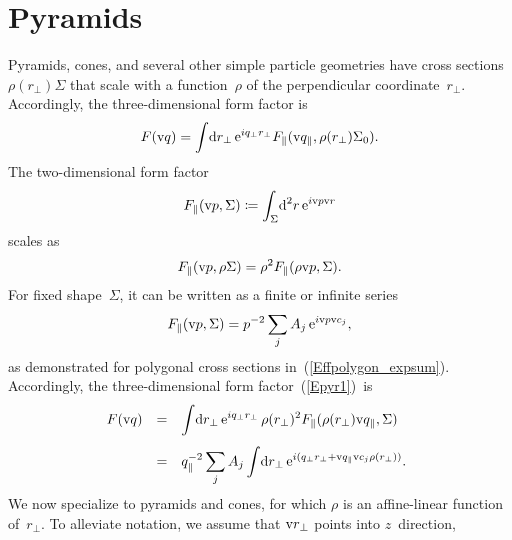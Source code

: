 %
%

\section{Pyramids}

%
%
%
%

Pyramids, cones, and several other simple particle geometries
 have cross sections~$\rho(r_\perp)\Sigma$ that scale
with a function~$\rho$ of the perpendicular coordinate~$r_\perp$.
Accordingly,
the three-dimensional form factor is
\begin{equation}\label{Epyr1}
  F(\text{v}{q})
  = \int\!\text{d} r_\perp\,\text{e}^{iq_\perp r_\perp} F_\parallel(\text{v}{q}_\parallel,\rho(r_\perp)\Sigma_0).
\end{equation}
The two-dimensional form factor
\begin{equation}
  F_\parallel(\text{v}{p},\Sigma) \coloneqq \int_\Sigma\!\text{d}^2r\,\text{e}^{i\text{v}{p}\text{v}{r}}
\end{equation}
scales as
\begin{equation}
  F_\parallel(\text{v}{p},\rho\Sigma) = \rho^2 F_\parallel(\rho\text{v}{p},\Sigma).
\end{equation}
For fixed shape~$\Sigma$,
it can be written as a finite or infinite series
\begin{equation}
  F_\parallel(\text{v}{p},\Sigma)=p^{-2}\sum_j A_j\, \text{e}^{i\text{v}{p} \text{v}{c}_j},
\end{equation}
as demonstrated for polygonal cross sections in~(\ref{Effpolygon_expsum}).
Accordingly, the three-dimen\-sional form factor~(\ref{Epyr1})~is
\begin{equation}
  \begin{array}{@{}lcl}
  F(\q)
  &=& \displaystyle
       \int\!\d r_\perp\,\e^{iq_\perp r_\perp}\,\rho(r_\perp)^2 F_\parallel(\rho(r_\perp)\q_\parallel,\Sigma)
\\[3ex]
  &=& \displaystyle
      q_\parallel^{-2}  \sum_j A_j
      \int\!\d r_\perp\,\e^{i(q_\perp r_\perp+\q_\parallel \v{c}_j\rho(r_\perp))}.
  \end{array}
\end{equation}
We now specialize to pyramids and cones,
for which $\rho$ is an affine-linear function of~$r_\perp$.
To alleviate notation,
we assume that $\text{v}{r}_\perp$ points into $z$~direction,
